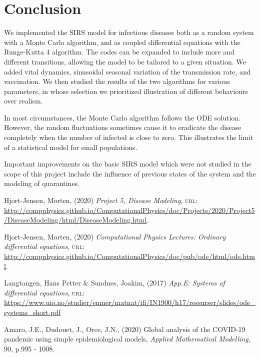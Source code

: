 \documentclass[a4paper,10pt,twocolumn]{article}
\begin{document}
%
%
%

\section{Conclusion}
We implemented the SIRS model for infectious diseases both as a random system with a Monte Carlo algorithm, and as coupled differential equations with the Runge-Kutta 4 algorithm. 
The codes can be expanded to include more and different transitions, allowing the model to be tailored to a given situation. We added vital dynamics, sinusoidal seasonal variation of the transmission rate, and vaccination. We then studied the results of the two algorithms for various parameters, in whose selection we prioritized illustration of different behaviours over realism. 

In most circumstances, the Monte Carlo algorithm follows the ODE solution. However, the random fluctuations sometimes cause it to eradicate the disease completely when the number of infected is close to zero. 
This illustrates the limit of a statistical model for small populations.     
 
Important improvements on the basic SIRS model which were not studied in the scope of this project include the influence of previous states of the system and the modeling of quarantines.


\begin{thebibliography}{9}

   

Hjort-Jensen, Morten, (2020) \textit{Project 5, Disease Modeling}, \textsc{url: }\url{http://compphysics.github.io/ComputationalPhysics/doc/Projects/2020/Project5/DiseaseModeling/html/DiseaseModeling.html}. 

Hjort-Jensen, Morten, (2020) \textit{Computational Physics Lectures: Ordinary differential equations}, \textsc{url: }\url{http://compphysics.github.io/ComputationalPhysics/doc/pub/ode/html/ode.html}.



Langtangen, Hans Petter \& Sundnes, Joakim, (2017) \textit{App.E: Systems of differential equations}, \textsc{url: }\url{https://www.uio.no/studier/emner/matnat/ifi/IN1900/h17/ressurser/slides/ode_systems_short.pdf}



Amaro, J.E., Dudouet, J., Orce, J.N., (2020) Global analysis of the COVID-19 pandemic using simple epidemiological models, \textit{Applied Mathematical Modelling}, 90, p.995 - 1008.

\end{thebibliography}



\end{document}
